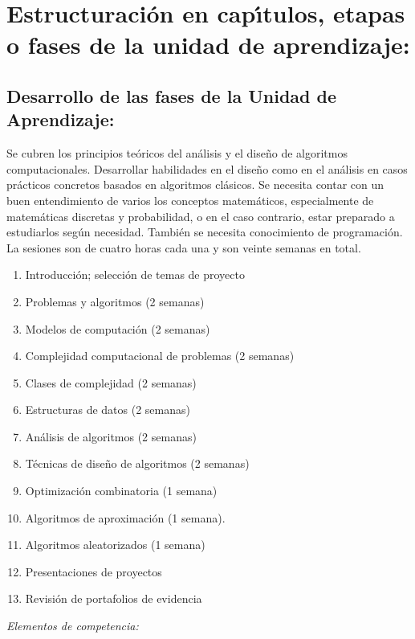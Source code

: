 \documentclass[10 pt]{article}
\begin{document}
\newpage

\section{Estructuraci\'{o}n en cap\'{\i}tulos, etapas o fases de la unidad de
  aprendizaje:}
\subsection{Desarrollo de las fases de la Unidad de Aprendizaje:}

Se cubren los principios te\'{o}ricos del an\'{a}lisis y el dise\~{n}o
de algoritmos computacionales. Desarrollar habilidades en el
dise\~{n}o como en el an\'{a}lisis en casos pr\'{a}cticos concretos
basados en algoritmos cl\'{a}sicos. Se necesita contar con un buen
entendimiento de varios los conceptos matem\'{a}ticos, especialmente
de matem\'{a}ticas discretas y probabilidad, o en el caso contrario,
estar preparado a estudiarlos seg\'{u}n necesidad. Tambi\'{e}n se
necesita conocimiento de programaci\'{o}n. La sesiones son de cuatro
horas cada una y son veinte semanas en total.
\begin{enumerate}[itemsep=-3pt]
\item{Introducci\'{o}n; selecci\'{o}n de temas de proyecto}
\item{Problemas y algoritmos (2 semanas)}
\item{Modelos de computaci\'{o}n (2 semanas)} 
\item{Complejidad computacional de problemas (2 semanas)}
\item{Clases de complejidad (2 semanas)} 
\item{Estructuras de datos (2 semanas)} 
\item{An\'{a}lisis de algoritmos (2 semanas)}
\item{T\'{e}cnicas de dise\~{n}o de algoritmos (2 semanas)} 
\item{Optimizaci\'{o}n combinatoria (1 semana)} 
\item{Algoritmos de aproximaci\'{o}n (1 semana).}
\item{Algoritmos aleatorizados (1 semana)} 
\item{Presentaciones de proyectos}
\item{Revisi\'{o}n de portafolios de evidencia}
\end{enumerate}

{\em Elementos de competencia:}


\end{document}

